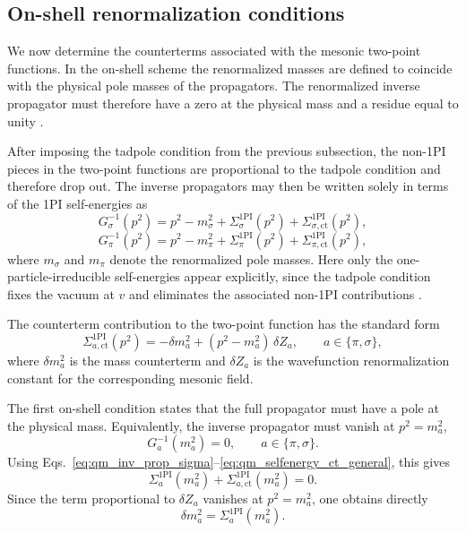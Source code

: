 \subsection{On-shell renormalization conditions}

We now determine the counterterms associated with the mesonic
two-point functions. In the on-shell scheme the renormalized masses
are defined to coincide with the physical pole masses of the
propagators. The renormalized inverse propagator must therefore have
a zero at the physical mass and a residue equal to unity
\cite{PeskinSchroeder1995,WeinbergQFT,Folkestad2018,Andersen2024}.

After imposing the tadpole condition from the previous subsection,
the non-1PI pieces in the two-point functions are proportional to the
tadpole condition and therefore drop out. The inverse propagators may
then be written solely in terms of the 1PI self-energies as
\begin{equation}
G_\sigma^{-1}(p^2)
=
p^2 - m_\sigma^2
+ \Sigma_\sigma^{\mathrm{1PI}}(p^2)
+ \Sigma_{\sigma,\mathrm{ct}}^{\mathrm{1PI}}(p^2),
\label{eq:qm_inv_prop_sigma}
\end{equation}
\begin{equation}
G_\pi^{-1}(p^2)
=
p^2 - m_\pi^2
+ \Sigma_\pi^{\mathrm{1PI}}(p^2)
+ \Sigma_{\pi,\mathrm{ct}}^{\mathrm{1PI}}(p^2),
\label{eq:qm_inv_prop_pi}
\end{equation}
where \(m_\sigma\) and \(m_\pi\) denote the renormalized pole masses.
Here only the one-particle-irreducible self-energies appear
explicitly, since the tadpole condition fixes the vacuum at \(v\) and
eliminates the associated non-1PI contributions
\cite{Folkestad2018}.

The counterterm contribution to the two-point function has the
standard form
\begin{equation}
\Sigma_{a,\mathrm{ct}}^{\mathrm{1PI}}(p^2)
=
-\delta m_a^2
+
(p^2-m_a^2)\,\delta Z_a,
\qquad
a\in\{\pi,\sigma\},
\label{eq:qm_selfenergy_ct_general}
\end{equation}
where \(\delta m_a^2\) is the mass counterterm and \(\delta Z_a\) is
the wavefunction renormalization constant for the corresponding
mesonic field.

The first on-shell condition states that the full propagator must have
a pole at the physical mass. Equivalently, the inverse propagator must
vanish at \(p^2=m_a^2\),
\begin{equation}
G_a^{-1}(m_a^2)=0,
\qquad
a\in\{\pi,\sigma\}.
\label{eq:qm_OS_pole_condition}
\end{equation}
Using Eqs.~\eqref{eq:qm_inv_prop_sigma}--\eqref{eq:qm_selfenergy_ct_general},
this gives
\begin{equation}
\Sigma_a^{\mathrm{1PI}}(m_a^2)
+
\Sigma_{a,\mathrm{ct}}^{\mathrm{1PI}}(m_a^2)
=0.
\end{equation}
Since the term proportional to \(\delta Z_a\) vanishes at
\(p^2=m_a^2\), one obtains directly
\begin{equation}
\delta m_a^2
=
\Sigma_a^{\mathrm{1PI}}(m_a^2).
\label{eq:qm_delta_ma_general}
\end{equation}

